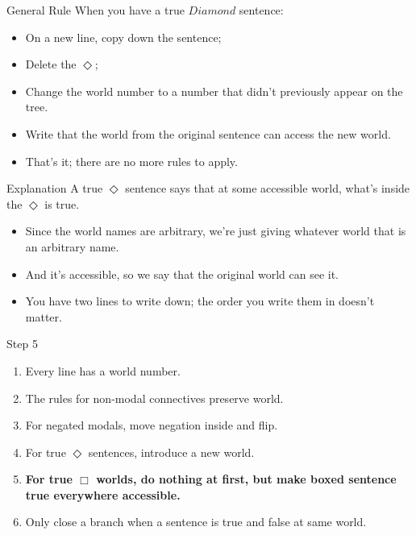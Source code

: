 \documentclass[
  14pt,
  letterpaper,
  ignorenonframetext,
  aspectratio=169,
]{beamer}
\providecommand{\tightlist}{%
  \setlength{\itemsep}{0pt}\setlength{\parskip}{0pt}}\usepackage{longtable,booktabs,array}
\begin{document}
\begin{frame}{General Rule}
\protect\hypertarget{general-rule}{}
When you have a true \(Diamond\) sentence:

\begin{itemize}
\tightlist
\item
  On a new line, copy down the sentence;
\item
  Delete the \(\Diamond\);
\item
  Change the world number to a number that didn't previously appear on
  the tree.
\item
  Write that the world from the original sentence can access the new
  world.
\item
  That's it; there are no more rules to apply.
\end{itemize}
\end{frame}

\begin{frame}{Explanation}
\protect\hypertarget{explanation}{}
A true \(\Diamond\) sentence says that at some accessible world, what's
inside the \(\Diamond\) is true.

\begin{itemize}
\tightlist
\item
  Since the world names are arbitrary, we're just giving whatever world
  that is an arbitrary name.
\item
  And it's accessible, so we say that the original world can see it.
\item
  You have two lines to write down; the order you write them in doesn't
  matter.
\end{itemize}
\end{frame}

\begin{frame}{Step 5}
\protect\hypertarget{step-5}{}
\begin{enumerate}
\tightlist
\item
  Every line has a world number.
\item
  The rules for non-modal connectives preserve world.
\item
  For negated modals, move negation inside and flip.
\item
  For true \(\Diamond\) sentences, introduce a new world.
\item
  \textbf{For true \(\Box\) worlds, do nothing at first, but make boxed
  sentence true everywhere accessible.}
\item
  Only close a branch when a sentence is true and false at same world.
\end{enumerate}
\end{frame}
\end{document}
